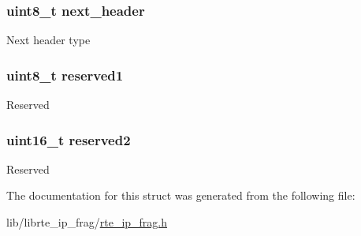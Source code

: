 \subsubsection[{next\+\_\+header}]{\setlength{\rightskip}{0pt plus 5cm}uint8\+\_\+t next\+\_\+header}\label{structipv6__extension__fragment_a045daeeb2d6d7b5c4706eb5ca627e84c}
Next header type \hypertarget{structipv6__extension__fragment_a2a2556147677ece60b8aadf4a0d608ed}{}
\subsubsection[{reserved1}]{\setlength{\rightskip}{0pt plus 5cm}uint8\+\_\+t reserved1}\label{structipv6__extension__fragment_a2a2556147677ece60b8aadf4a0d608ed}
Reserved \hypertarget{structipv6__extension__fragment_a0fc429b055e74830a4583ec37f5c3846}{}
\subsubsection[{reserved2}]{\setlength{\rightskip}{0pt plus 5cm}uint16\+\_\+t reserved2}\label{structipv6__extension__fragment_a0fc429b055e74830a4583ec37f5c3846}
Reserved 

The documentation for this struct was generated from the following file\+:\begin{DoxyCompactItemize}
\item 
lib/librte\+\_\+ip\+\_\+frag/\hyperlink{rte__ip__frag_8h}{rte\+\_\+ip\+\_\+frag.\+h}\end{DoxyCompactItemize}
